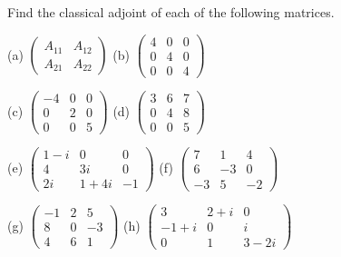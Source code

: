 \begin{exercise} \label{exercise 4.3.26}
Find the classical adjoint of each of the following matrices.

(a) \(\left(\begin{array}{ll}A_{11} & A_{12} \\ A_{21} & A_{22}\end{array}\right)\)
(b) \(\left(\begin{array}{lll}4 & 0 & 0 \\ 0 & 4 & 0 \\ 0 & 0 & 4\end{array}\right)\)

(c) \(\left(\begin{array}{rrr}-4 & 0 & 0 \\ 0 & 2 & 0 \\ 0 & 0 & 5\end{array}\right)\)
(d) \(\left(\begin{array}{lll}3 & 6 & 7 \\ 0 & 4 & 8 \\ 0 & 0 & 5\end{array}\right)\)

(e) \(\left(\begin{array}{ccc}1-i & 0 & 0 \\ 4 & 3 i & 0 \\ 2 i & 1+4 i & -1\end{array}\right)\)
(f) \(\left(\begin{array}{rrr}7 & 1 & 4 \\ 6 & -3 & 0 \\ -3 & 5 & -2\end{array}\right)\)

(g) \(\left(\begin{array}{rrr}-1 & 2 & 5 \\ 8 & 0 & -3 \\ 4 & 6 & 1\end{array}\right)\)
(h) \(\left(\begin{array}{ccc}3 & 2+i & 0 \\ -1+i & 0 & i \\ 0 & 1 & 3-2 i\end{array}\right)\)
\end{exercise}

